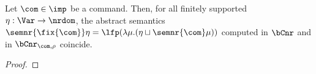 
\begin{lemma}
  Let \(\com\in \imp\) be a command. Then, for all finitely supported
  \(\eta : \Var \to \nrdom\), the abstract semantics
  \(\semnr{\fix{\com}} \eta = \lfp(\lambda \mu . (\eta \sqcup
  \semnr{\com}\mu))\)
  computed in \(\bCnr\) and in \(\bCnr_{\com,\rho}\)
  coincide.
\end{lemma}

\begin{proof}
\end{proof}
